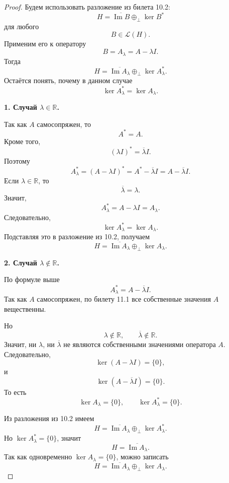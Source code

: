 \begin{proof}
	Будем использовать разложение из билета 10.2:
	\[
	H=\overline{\operatorname{Im}B}\oplus_{\perp}\ker B^*
	\]
	для любого
	\[
	B\in\mathcal{L}(H).
	\]
	Применим его к оператору
	\[
	B=A_\lambda=A-\lambda I.
	\]
	Тогда
	\[
	H=\overline{\operatorname{Im}A_\lambda}\oplus_{\perp}\ker A_\lambda^*.
	\]
	Остаётся понять, почему в данном случае
	\[
	\ker A_\lambda^*=\ker A_\lambda.
	\]
	
	\textbf{1. Случай \(\lambda\in\mathbb{R}\).}
	
	Так как \(A\) самосопряжен, то
	\[
	A^*=A.
	\]
	Кроме того,
	\[
	(\lambda I)^*=\overline{\lambda}I.
	\]
	Поэтому
	\[
	A_\lambda^*
	=
	(A-\lambda I)^*
	=
	A^*-\overline{\lambda}I
	=
	A-\overline{\lambda}I.
	\]
	Если \(\lambda\in\mathbb{R}\), то
	\[
	\overline{\lambda}=\lambda.
	\]
	Значит,
	\[
	A_\lambda^*=A-\lambda I=A_\lambda.
	\]
	Следовательно,
	\[
	\ker A_\lambda^*=\ker A_\lambda.
	\]
	Подставляя это в разложение из 10.2, получаем
	\[
	H=\overline{\operatorname{Im}A_\lambda}\oplus_{\perp}\ker A_\lambda.
	\]
	
	\textbf{2. Случай \(\lambda\notin\mathbb{R}\).}
	
	По формуле выше
	\[
	A_\lambda^*=A-\overline{\lambda}I.
	\]
	Так как \(A\) самосопряжен, по билету 11.1 все собственные значения \(A\) вещественны.
	
	Но
	\[
	\lambda\notin\mathbb{R},
	\qquad
	\overline{\lambda}\notin\mathbb{R}.
	\]
	Значит, ни \(\lambda\), ни \(\overline{\lambda}\) не являются собственными значениями оператора \(A\).
	Следовательно,
	\[
	\ker(A-\lambda I)=\{0\},
	\]
	и
	\[
	\ker(A-\overline{\lambda}I)=\{0\}.
	\]
	То есть
	\[
	\ker A_\lambda=\{0\},
	\qquad
	\ker A_\lambda^*=\{0\}.
	\]
	
	Из разложения из 10.2 имеем
	\[
	H=\overline{\operatorname{Im}A_\lambda}\oplus_{\perp}\ker A_\lambda^*.
	\]
	Но \(\ker A_\lambda^*=\{0\}\), значит
	\[
	H=\overline{\operatorname{Im}A_\lambda}.
	\]
	Так как одновременно \(\ker A_\lambda=\{0\}\), можно записать
	\[
	H=\overline{\operatorname{Im}A_\lambda}\oplus_{\perp}\ker A_\lambda.
	\]
\end{proof}